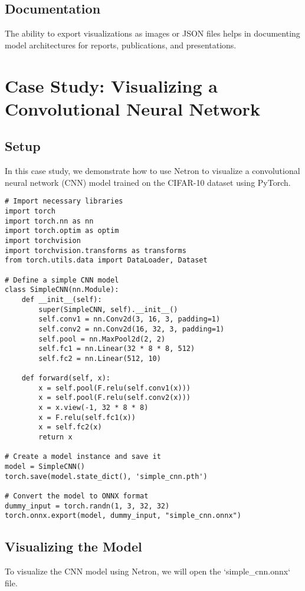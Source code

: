 \subsection{Documentation}
The ability to export visualizations as images or JSON files helps in documenting model architectures for reports, publications, and presentations.

\section{Case Study: Visualizing a Convolutional Neural Network}

\subsection{Setup}
In this case study, we demonstrate how to use Netron to visualize a convolutional neural network (CNN) model trained on the CIFAR-10 dataset using PyTorch.

\begin{verbatim}
# Import necessary libraries
import torch
import torch.nn as nn
import torch.optim as optim
import torchvision
import torchvision.transforms as transforms
from torch.utils.data import DataLoader, Dataset

# Define a simple CNN model
class SimpleCNN(nn.Module):
    def __init__(self):
        super(SimpleCNN, self).__init__()
        self.conv1 = nn.Conv2d(3, 16, 3, padding=1)
        self.conv2 = nn.Conv2d(16, 32, 3, padding=1)
        self.pool = nn.MaxPool2d(2, 2)
        self.fc1 = nn.Linear(32 * 8 * 8, 512)
        self.fc2 = nn.Linear(512, 10)
    
    def forward(self, x):
        x = self.pool(F.relu(self.conv1(x)))
        x = self.pool(F.relu(self.conv2(x)))
        x = x.view(-1, 32 * 8 * 8)
        x = F.relu(self.fc1(x))
        x = self.fc2(x)
        return x

# Create a model instance and save it
model = SimpleCNN()
torch.save(model.state_dict(), 'simple_cnn.pth')

# Convert the model to ONNX format
dummy_input = torch.randn(1, 3, 32, 32)
torch.onnx.export(model, dummy_input, "simple_cnn.onnx")
\end{verbatim}

\subsection{Visualizing the Model}
To visualize the CNN model using Netron, we will open the `simple_cnn.onnx` file.

